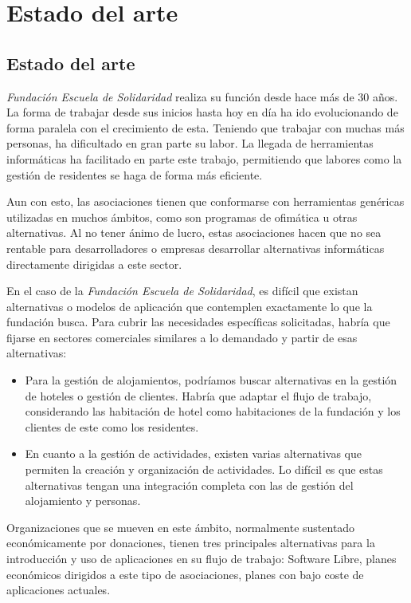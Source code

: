 \chapter{Estado del arte}

\section{Estado del arte}

\textit{Fundación Escuela de Solidaridad} realiza su función desde hace más de 30 años. La forma de trabajar desde sus inicios hasta hoy en día ha ido evolucionando de forma paralela con el crecimiento de esta. Teniendo que trabajar con muchas más personas, ha dificultado en gran parte su labor. La llegada de herramientas informáticas ha facilitado en parte este trabajo, permitiendo que labores como la gestión de residentes se haga de forma más eficiente. 

Aun con esto, las asociaciones tienen que conformarse con herramientas genéricas utilizadas en muchos ámbitos, como son programas de ofimática u otras alternativas. Al no tener ánimo de lucro, estas asociaciones hacen que no sea rentable para desarrolladores o empresas desarrollar alternativas informáticas directamente dirigidas a este sector. 

En el caso de la \textit{Fundación Escuela de Solidaridad}, es difícil que existan alternativas o modelos de aplicación que contemplen exactamente lo que la fundación busca. Para cubrir las necesidades específicas solicitadas, habría que fijarse en sectores comerciales similares a lo demandado y partir de esas alternativas:

\begin{itemize}
    \item Para la gestión de alojamientos, podríamos buscar alternativas en la gestión de hoteles o gestión de clientes. Habría que adaptar el flujo de trabajo, considerando las habitación de hotel como habitaciones de la fundación y los clientes de este como los residentes.
    \item En cuanto a la gestión de actividades, existen varias alternativas que permiten la creación y organización de actividades. Lo difícil es que estas alternativas tengan una integración completa con las de gestión del alojamiento y personas.
\end{itemize}

Organizaciones que se mueven en este ámbito, normalmente sustentado económicamente por donaciones, tienen tres principales alternativas para la introducción y uso de aplicaciones en su flujo de trabajo: Software Libre, planes económicos dirigidos a este tipo de asociaciones, planes con bajo coste de aplicaciones actuales. 

